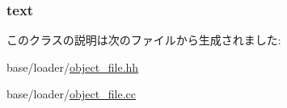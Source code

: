 \label{classObjectFile_a59ee96d686807b0019e538b4cdad36cf}
\hypertarget{classObjectFile_afa43ec010e59dc9f2d3f6a76dde82e25}{
\subsubsection[{text}]{ {\bf text}}}
\label{classObjectFile_afa43ec010e59dc9f2d3f6a76dde82e25}


このクラスの説明は次のファイルから生成されました:\begin{DoxyCompactItemize}
\item 
base/loader/\hyperlink{object__file_8hh}{object\_\-file.hh}\item 
base/loader/\hyperlink{object__file_8cc}{object\_\-file.cc}\end{DoxyCompactItemize}
